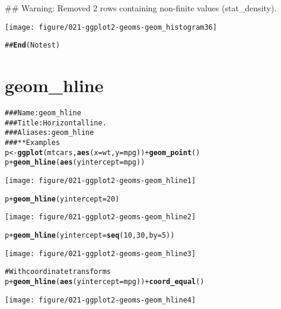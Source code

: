 \documentclass[a4paper,titlepage]{tufte-handout}\usepackage{graphicx, color}
\makeatletter
\def\maxwidth{ %
  \ifdim\Gin@nat@width>\linewidth
    \linewidth
  \else
    \Gin@nat@width
  \fi
}
\newcommand{\hlfunctioncall}[1]{\textcolor[rgb]{0.501960784313725,0,0.329411764705882}{\textbf{#1}}}%
\newcommand{\hlcomment}[1]{\textcolor[rgb]{0.180392156862745,0.6,0.341176470588235}{#1}}%
\newenvironment{kframe}{%
 \def\at@end@of@kframe{}%
 \ifinner\ifhmode%
  \def\at@end@of@kframe{\end{minipage}}%
  \begin{minipage}{\columnwidth}%
 \fi\fi%
 \def\FrameCommand##1{\hskip\@totalleftmargin \hskip-\fboxsep
 \colorbox{shadecolor}{##1}\hskip-\fboxsep
     \hskip-\linewidth \hskip-\@totalleftmargin \hskip\columnwidth}%
 \MakeFramed {\advance\hsize-\width
   \@totalleftmargin\z@ \linewidth\hsize
   \@setminipage}}%
 {\par\unskip\endMakeFramed%
 \at@end@of@kframe}
\newenvironment{knitrout}{}{} %
\makeatother
\begin{document}
\begin{knitrout}
\begin{kframe}
{\ttfamily\noindent\textcolor{warningcolor}{\#\# Warning: Removed 2 rows containing non-finite values (stat\_density).}}\end{kframe}\texttt{[image: figure/021-ggplot2-geoms-geom\_histogram36]} \begin{kframe}\begin{alltt}
\hlcomment{## \hlfunctioncall{End}(No test)}
\end{alltt}
\end{kframe}
\end{knitrout}


\section{geom\_hline}

\begin{knitrout}
\color{fgcolor}\begin{kframe}
\begin{alltt}
\hlcomment{### Name: geom_hline}
\hlcomment{### Title: Horizontal line.}
\hlcomment{### Aliases: geom_hline}
\hlcomment{### ** Examples}
p <- \hlfunctioncall{ggplot}(mtcars, \hlfunctioncall{aes}(x = wt, y=mpg)) + \hlfunctioncall{geom_point}()
p + \hlfunctioncall{geom_hline}(\hlfunctioncall{aes}(yintercept=mpg))
\end{alltt}
\end{kframe}\texttt{[image: figure/021-ggplot2-geoms-geom\_hline1]} \begin{kframe}\begin{alltt}
p + \hlfunctioncall{geom_hline}(yintercept=20)
\end{alltt}
\end{kframe}\texttt{[image: figure/021-ggplot2-geoms-geom\_hline2]} \begin{kframe}\begin{alltt}
p + \hlfunctioncall{geom_hline}(yintercept=\hlfunctioncall{seq}(10, 30, by=5))
\end{alltt}
\end{kframe}\texttt{[image: figure/021-ggplot2-geoms-geom\_hline3]} \begin{kframe}\begin{alltt}
\hlcomment{# With coordinate transforms}
p + \hlfunctioncall{geom_hline}(\hlfunctioncall{aes}(yintercept=mpg)) + \hlfunctioncall{coord_equal}()
\end{alltt}
\end{kframe}\texttt{[image: figure/021-ggplot2-geoms-geom\_hline4]} \begin{kframe}\begin{alltt}

\end{alltt}
\end{kframe}
\end{knitrout}
\end{document}
